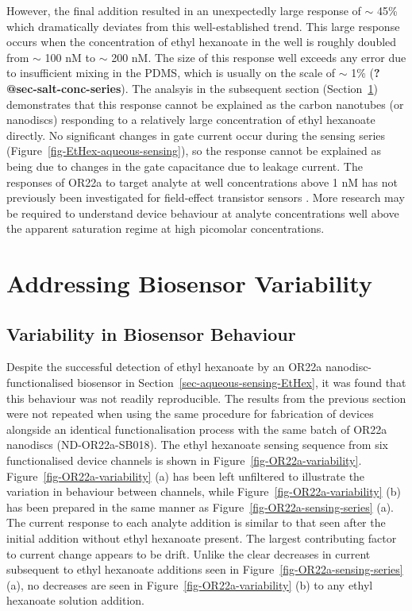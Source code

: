 \documentclass[
  a4paper,
]{scrbook}
\begin{document}
However, the final addition resulted in an unexpectedly large response
of \(\sim\) 45\% which dramatically deviates from this well-established
trend. This large response occurs when the concentration of ethyl
hexanoate in the well is roughly doubled from \(\sim\) 100 nM to
\(\sim\) 200 nM. The size of this response well exceeds any error due to
insufficient mixing in the PDMS, which is usually on the scale of
\(\sim\) 1\% (\textbf{?@sec-salt-conc-series}). The analsyis in the
subsequent section (Section~\ref{sec-variability}) demonstrates that
this response cannot be explained as the carbon nanotubes (or nanodiscs)
responding to a relatively large concentration of ethyl hexanoate
directly. No significant changes in gate current occur during the
sensing series (Figure~\ref{fig-EtHex-aqueous-sensing}), so the response
cannot be explained as being due to changes in the gate capacitance due
to leakage current. The responses of OR22a to target analyte at well
concentrations above 1 nM has not previously been investigated for
field-effect transistor sensors
\autocite{Murugathas2019b,Murugathas2020}. More research may be required
to understand device behaviour at analyte concentrations well above the
apparent saturation regime at high picomolar concentrations.

\hypertarget{sec-variability}{%
\section{Addressing Biosensor Variability}\label{sec-variability}}

\hypertarget{sec-variability-biosensor}{%
\subsection{Variability in Biosensor
Behaviour}\label{sec-variability-biosensor}}

Despite the successful detection of ethyl hexanoate by an OR22a
nanodisc-functionalised biosensor in
Section~\ref{sec-aqueous-sensing-EtHex}, it was found that this
behaviour was not readily reproducible. The results from the previous
section were not repeated when using the same procedure for fabrication
of devices alongside an identical functionalisation process with the
same batch of OR22a nanodiscs (ND-OR22a-SB018). The ethyl hexanoate
sensing sequence from six functionalised device channels is shown in
Figure~\ref{fig-OR22a-variability}. Figure~\ref{fig-OR22a-variability}
(a) has been left unfiltered to illustrate the variation in behaviour
between channels, while Figure~\ref{fig-OR22a-variability} (b) has been
prepared in the same manner as Figure~\ref{fig-OR22a-sensing-series}
(a). The current response to each analyte addition is similar to that
seen after the initial addition without ethyl hexanoate present. The
largest contributing factor to current change appears to be drift.
Unlike the clear decreases in current subsequent to ethyl hexanoate
additions seen in Figure~\ref{fig-OR22a-sensing-series} (a), no
decreases are seen in Figure~\ref{fig-OR22a-variability} (b) to any
ethyl hexanoate solution addition.
\end{document}
